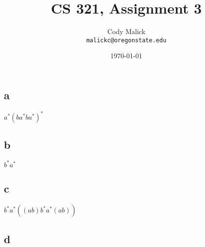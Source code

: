 \documentclass[10pt,letterpaper]{article}
\begin{document}
  \title{CS 321, Assignment 3}
  \author{Cody Malick\\
  \texttt{malickc@oregonstate.edu}}
  \date{\today}
  \maketitle

\section{}
\subsection*{a}
$a^*(ba^*ba^*)^*$
\subsection*{b}
$b^*a^*$
\subsection*{c}
$b^*a^*((ab)b^*a^*(ab))$
\subsection*{d}
\section{}
\section{}
\section{}
\end{document}
